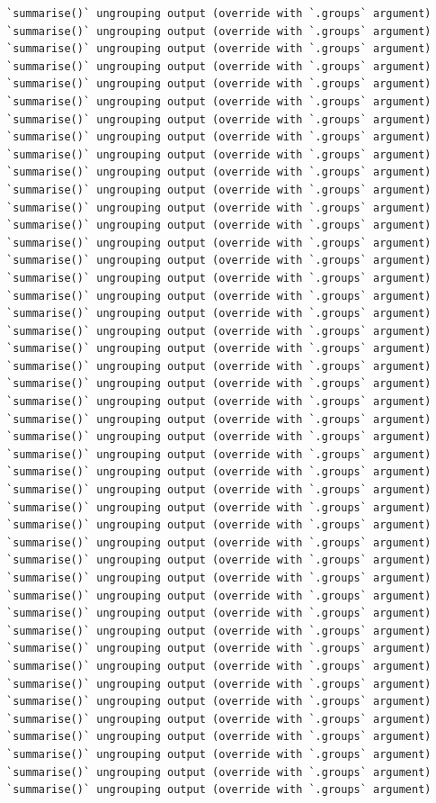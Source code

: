 \documentclass[
]{book}
\begin{document}
\begin{verbatim}
`summarise()` ungrouping output (override with `.groups` argument)
`summarise()` ungrouping output (override with `.groups` argument)
`summarise()` ungrouping output (override with `.groups` argument)
`summarise()` ungrouping output (override with `.groups` argument)
`summarise()` ungrouping output (override with `.groups` argument)
`summarise()` ungrouping output (override with `.groups` argument)
`summarise()` ungrouping output (override with `.groups` argument)
`summarise()` ungrouping output (override with `.groups` argument)
`summarise()` ungrouping output (override with `.groups` argument)
`summarise()` ungrouping output (override with `.groups` argument)
`summarise()` ungrouping output (override with `.groups` argument)
`summarise()` ungrouping output (override with `.groups` argument)
`summarise()` ungrouping output (override with `.groups` argument)
`summarise()` ungrouping output (override with `.groups` argument)
`summarise()` ungrouping output (override with `.groups` argument)
`summarise()` ungrouping output (override with `.groups` argument)
`summarise()` ungrouping output (override with `.groups` argument)
`summarise()` ungrouping output (override with `.groups` argument)
`summarise()` ungrouping output (override with `.groups` argument)
`summarise()` ungrouping output (override with `.groups` argument)
`summarise()` ungrouping output (override with `.groups` argument)
`summarise()` ungrouping output (override with `.groups` argument)
`summarise()` ungrouping output (override with `.groups` argument)
`summarise()` ungrouping output (override with `.groups` argument)
`summarise()` ungrouping output (override with `.groups` argument)
`summarise()` ungrouping output (override with `.groups` argument)
`summarise()` ungrouping output (override with `.groups` argument)
`summarise()` ungrouping output (override with `.groups` argument)
`summarise()` ungrouping output (override with `.groups` argument)
`summarise()` ungrouping output (override with `.groups` argument)
`summarise()` ungrouping output (override with `.groups` argument)
`summarise()` ungrouping output (override with `.groups` argument)
`summarise()` ungrouping output (override with `.groups` argument)
`summarise()` ungrouping output (override with `.groups` argument)
`summarise()` ungrouping output (override with `.groups` argument)
`summarise()` ungrouping output (override with `.groups` argument)
`summarise()` ungrouping output (override with `.groups` argument)
`summarise()` ungrouping output (override with `.groups` argument)
`summarise()` ungrouping output (override with `.groups` argument)
`summarise()` ungrouping output (override with `.groups` argument)
`summarise()` ungrouping output (override with `.groups` argument)
`summarise()` ungrouping output (override with `.groups` argument)
`summarise()` ungrouping output (override with `.groups` argument)
`summarise()` ungrouping output (override with `.groups` argument)
`summarise()` ungrouping output (override with `.groups` argument)
\end{verbatim}
\end{document}
